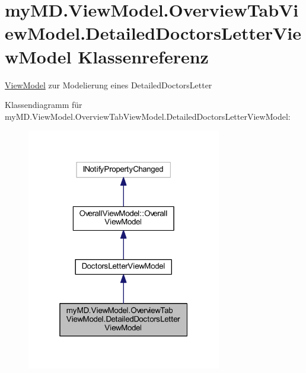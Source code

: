 \hypertarget{classmy_m_d_1_1_view_model_1_1_overview_tab_view_model_1_1_detailed_doctors_letter_view_model}{}\section{my\+M\+D.\+View\+Model.\+Overview\+Tab\+View\+Model.\+Detailed\+Doctors\+Letter\+View\+Model Klassenreferenz}
\label{classmy_m_d_1_1_view_model_1_1_overview_tab_view_model_1_1_detailed_doctors_letter_view_model}


\mbox{\hyperlink{namespacemy_m_d_1_1_view_model}{View\+Model}} zur Modelierung eines Detailed\+Doctors\+Letter  




Klassendiagramm für my\+M\+D.\+View\+Model.\+Overview\+Tab\+View\+Model.\+Detailed\+Doctors\+Letter\+View\+Model\+:\nopagebreak
\begin{figure}[H]
\begin{center}
\leavevmode
\includegraphics[width=241pt]{classmy_m_d_1_1_view_model_1_1_overview_tab_view_model_1_1_detailed_doctors_letter_view_model__inherit__graph}
\end{center}
\end{figure}


